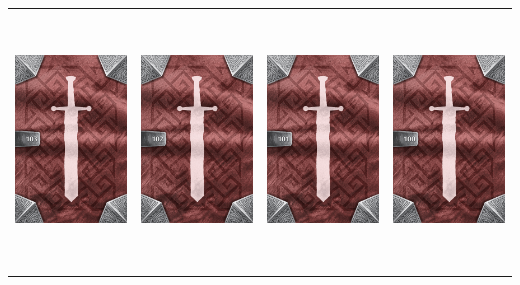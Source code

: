 \documentclass{minimal}
\begin{document}
{\begin{longtable}{llll}
\includegraphics[width=44mm,height=68mm]{./64-151/gh-103-drakescale-armor-back.png} &
\includegraphics[width=44mm,height=68mm]{./64-151/gh-102-sacrificial-robes-back.png} &
\includegraphics[width=44mm,height=68mm]{./64-151/gh-101-second-skin-back.png} &
\includegraphics[width=44mm,height=68mm]{./64-151/gh-100-robes-of-summoning-back.png}\\ 

\end{longtable}}
\end{document}
